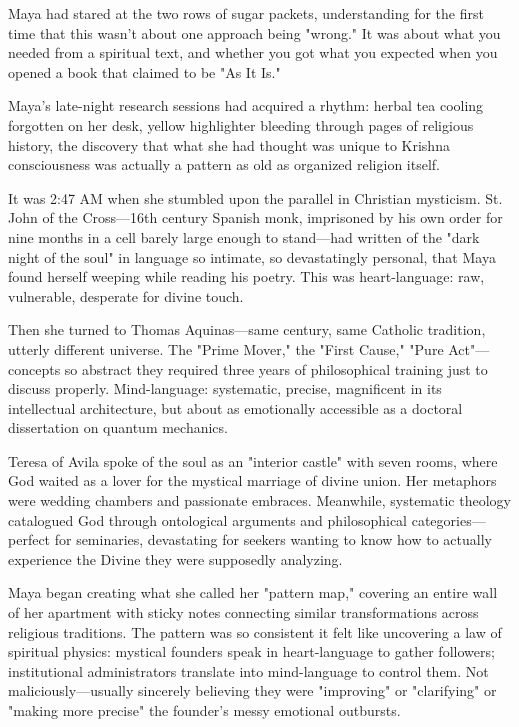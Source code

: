 \documentclass[12pt,twoside]{book}
\begin{document}
Maya had stared at the two rows of sugar packets, understanding for the first time that this wasn't about one approach being "wrong." It was about what you needed from a spiritual text, and whether you got what you expected when you opened a book that claimed to be "As It Is."

Maya's late-night research sessions had acquired a rhythm: herbal tea cooling forgotten on her desk, yellow highlighter bleeding through pages of religious history, the discovery that what she had thought was unique to Krishna consciousness was actually a pattern as old as organized religion itself.

It was 2:47 AM when she stumbled upon the parallel in Christian mysticism. St. John of the Cross—16th century Spanish monk, imprisoned by his own order for nine months in a cell barely large enough to stand—had written of the "dark night of the soul" in language so intimate, so devastatingly personal, that Maya found herself weeping while reading his poetry. This was heart-language: raw, vulnerable, desperate for divine touch.

Then she turned to Thomas Aquinas—same century, same Catholic tradition, utterly different universe. The "Prime Mover," the "First Cause," "Pure Act"—concepts so abstract they required three years of philosophical training just to discuss properly. Mind-language: systematic, precise, magnificent in its intellectual architecture, but about as emotionally accessible as a doctoral dissertation on quantum mechanics.

Teresa of Avila spoke of the soul as an "interior castle" with seven rooms, where God waited as a lover for the mystical marriage of divine union. Her metaphors were wedding chambers and passionate embraces. Meanwhile, systematic theology catalogued God through ontological arguments and philosophical categories—perfect for seminaries, devastating for seekers wanting to know how to actually experience the Divine they were supposedly analyzing.

Maya began creating what she called her "pattern map," covering an entire wall of her apartment with sticky notes connecting similar transformations across religious traditions. The pattern was so consistent it felt like uncovering a law of spiritual physics: mystical founders speak in heart-language to gather followers; institutional administrators translate into mind-language to control them. Not maliciously—usually sincerely believing they were "improving" or "clarifying" or "making more precise" the founder's messy emotional outbursts.
\end{document}
